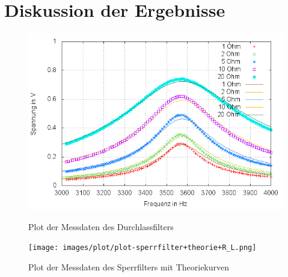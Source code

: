 \section{Diskussion der Ergebnisse}
\begin{figure}
	\includegraphics[width=.9\textwidth]{images/plot/durchlassfilter+theorie+R_ges-fit.png}
\caption{Plot der Messdaten des Durchlassfilters}
\label{plot:durchlass+R_ges-fit}

	\texttt{[image: images/plot/plot-sperrfilter+theorie+R\_L.png]}
\caption{Plot der Messdaten des Sperrfilters mit Theoriekurven}
\label{plot:sperr}
\end{figure}